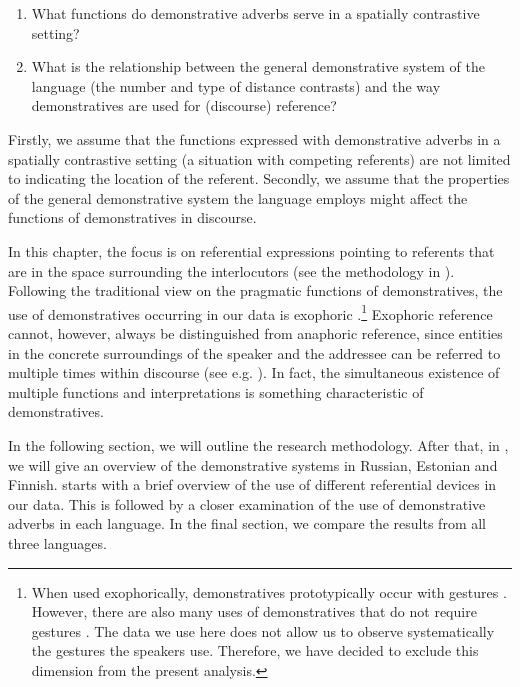 \documentclass[output=paper,colorlinks,citecolor=brown]{langscibook}
\begin{document}
\begin{enumerate}
\item What functions do demonstrative adverbs serve in a spatially contrastive setting?
\item What is the relationship between the general demonstrative system of the language (the number and type of distance contrasts) and the way demonstratives are used for (discourse) reference?
\end{enumerate}

Firstly, we assume that the functions expressed with demonstrative adverbs in a spatially contrastive setting (a situation with competing referents) are not limited to indicating the location of the referent. Secondly, we assume that the properties of the general demonstrative system the language employs might affect the functions of demonstratives in discourse. 

In this chapter, the focus is on referential expressions pointing to referents that are in the space surrounding the interlocutors (see the methodology in ). Following the traditional view on the pragmatic functions of demonstratives, the use of demonstratives occurring in our data is exophoric \citep{HallidayHasan1976}.\footnote{When used exophorically, demonstratives prototypically occur with gestures \citep{Diessel1999Book,Diessel2006,Levinson2004}. However, there are also many uses of demonstratives that do not require gestures \citep{LevinsonEtAl2018}. The data we use here does not allow us to observe systematically the gestures the speakers use. Therefore, we have decided to exclude this dimension from the present analysis.}  Exophoric reference cannot, however, always be distinguished from anaphoric reference, since entities in the concrete surroundings of the speaker and the addressee can be referred to multiple times within discourse (see e.g. \citealt{Levinson2004}). In fact, the simultaneous existence of multiple functions and interpretations is something characteristic of demonstratives.

In the following section, we will outline the research methodology. After that, in , we will give an overview of the demonstrative systems in Russian, Estonian and Finnish.  starts with a brief overview of the use of different referential devices in our data. This is followed by a closer examination of the use of demonstrative adverbs in each language. In the final section, we compare the results from all three languages.
\end{document}
